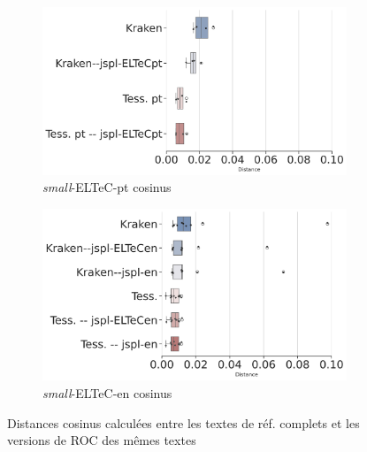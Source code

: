 \begin{figure}[h!]
    \begin{subfigure}{0.45\textwidth}
    \hspace{-0.9cm}
  \includegraphics[height=.58\textwidth]{IMAGES/Boite-a_moustache_12072024/ELTeC_Por_spaCy3.5.1/ELTeC_Por_spaCy3.5.1-cosinus-sim2-3.png} 
        \caption{\textit{small}-ELTeC-pt cosinus}
        \label{fig:ELTeC-Por_REF_cosinus}
   \end{subfigure}   
         \begin{subfigure}{0.45\textwidth}
  \includegraphics[height=.58\textwidth]{IMAGES/Boite-a_moustache_12072024/ELTeC_eng_spaCy3.5.1/ELTeC_eng_spaCy3.5.1-cosinus-sim2-3.png} 
        \caption{\textit{small}-ELTeC-en cosinus}
   \end{subfigure}   
    \caption{Distances cosinus calculées entre les textes de réf. complets et les versions de ROC des mêmes textes}
    \label{fig:distances_ref_roc}
\end{figure}

